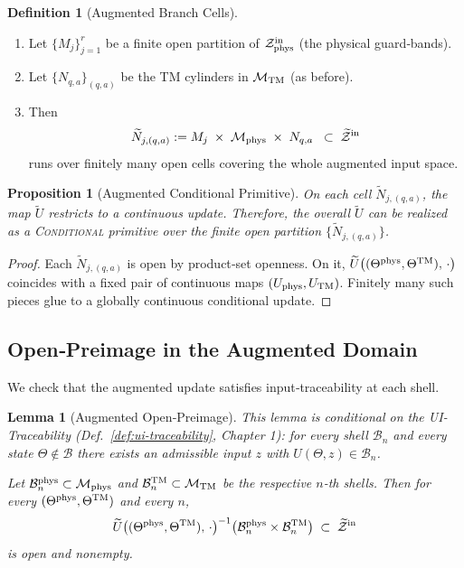 \documentclass[12pt]{article}
\theoremstyle{definition}
\newtheorem{definition}{Definition}[section]
\theoremstyle{plain}
\newtheorem{lemma}{Lemma}[section]
\newtheorem{proposition}{Proposition}[section]
\begin{document}
\begin{definition}[Augmented Branch Cells]
\begin{enumerate}
  \item Let \(\{M_j\}_{j=1}^r\) be a finite open partition of \(\mathcal Z^{\rm in}_{\rm phys}\) (the physical guard‑bands).
  \item Let \(\{N_{q,a}\}_{(q,a)}\) be the TM cylinders in \(\mathcal M_{\rm TM}\) (as before).
  \item Then 
  \[
    \widetilde N_{j,(q,a)}
    := M_j
       \;\times\;
       \mathcal M_{\rm phys}
       \;\times\;
       N_{q,a}
    \;\;\subset\;
    \widetilde{\mathcal Z}^{\rm in}
  \]
  runs over finitely many open cells covering the whole augmented input space.
\end{enumerate}
\end{definition}

\begin{proposition}[Augmented Conditional Primitive]
On each cell \(\widetilde N_{j,(q,a)}\), the map \(\widetilde U\) restricts to a continuous update.  Therefore, the overall \(\widetilde U\) can be realized as a \textsc{Conditional} primitive over the finite open partition \(\{\widetilde N_{j,(q,a)}\}\).
\end{proposition}

\begin{proof}
Each \(\widetilde N_{j,(q,a)}\) is open by product‐set openness.  On it,
\(\widetilde U\bigl((\Theta^{\rm phys},\Theta^{\rm TM}),\,\cdot\bigr)\)
coincides with a fixed pair of continuous maps
\((U_{\rm phys},U_{\rm TM})\).  Finitely many such pieces glue to a
globally continuous conditional update.
\end{proof}


\subsection{Open‑Preimage in the Augmented Domain}
\label{subsec:augmented-open-preimage}

We check that the augmented update satisfies input‑traceability at each shell.

\begin{lemma}[Augmented Open‑Preimage]
\label{lem:augmented-open-preimage}
This lemma is conditional on the \emph{UI-Traceability} (Def.~\ref{def:ui-traceability}, Chapter 1): for every shell $\mathcal{B}_n$ and every state $\Theta\notin\mathcal{B}$ there exists an admissible input $z$ with $U(\Theta,z)\in\mathcal{B}_n$.  

Let \(\mathcal B_n^{\rm phys}\subset\mathcal M_{\rm phys}\) and
\(\mathcal B_n^{\rm TM}\subset\mathcal M_{\rm TM}\) be the respective
\(n\)-th shells.  Then for every \((\Theta^{\rm phys},\Theta^{\rm TM})\)
and every \(n\),
\[
  \widetilde U\bigl((\Theta^{\rm phys},\Theta^{\rm TM}),\,\cdot\bigr)^{-1}
    \bigl(\mathcal B_n^{\rm phys}\times\mathcal B_n^{\rm TM}\bigr)
  \;\subset\;\widetilde{\mathcal Z}^{\rm in}
\]
is open and nonempty.
\end{lemma}
\end{document}
